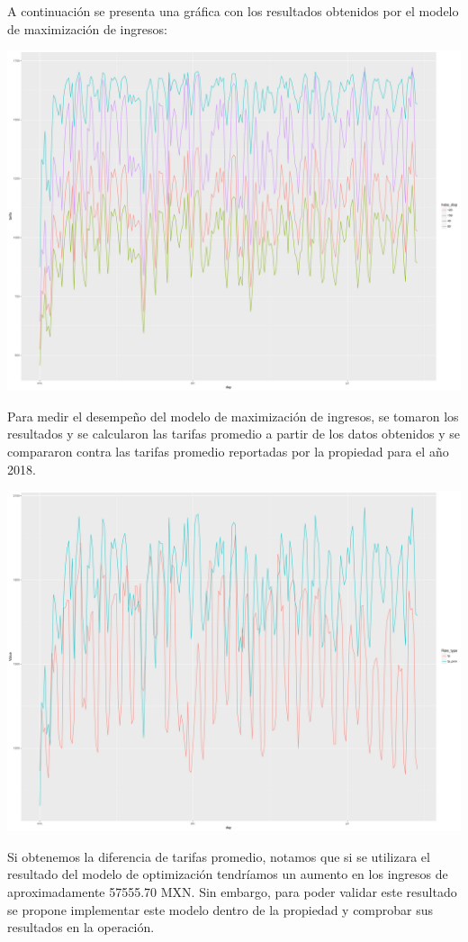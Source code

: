 A continuación se presenta una gráfica con los resultados obtenidos por el modelo de maximización de ingresos:

\includegraphics[width=\maxwidth]{figures/Pricing_graph-1} 

Para medir el desempeño del modelo de maximización de ingresos, se tomaron los resultados y se calcularon las tarifas promedio a partir de los datos obtenidos y se compararon contra las tarifas promedio reportadas por la propiedad para el año 2018.

\includegraphics[width=\maxwidth]{figures/Pricing-1} 

Si obtenemos la diferencia de tarifas promedio, notamos que si se utilizara el resultado del modelo de optimización tendríamos un aumento en los ingresos de aproximadamente 57555.70 MXN. Sin embargo, para poder validar este resultado se propone implementar este modelo dentro de la propiedad y comprobar sus resultados en la operación.





